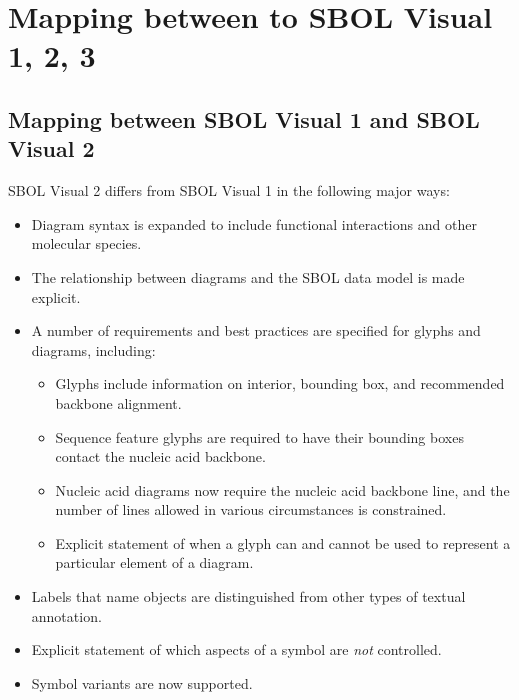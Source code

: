 \section{Mapping between to SBOL Visual 1, 2, 3}\label{sec:specmapping}

\subsection{Mapping between SBOL Visual 1 and SBOL Visual 2}\label{sec:sbol1}

SBOL Visual 2 differs from SBOL Visual 1 in the following major ways:
\begin{itemize}
\item Diagram syntax is expanded to include functional interactions and other molecular species.
\item The relationship between diagrams and the SBOL data model is made explicit.
\item A number of requirements and best practices are specified for glyphs and diagrams, including:
	\begin{itemize}
	\item Glyphs include information on interior, bounding box, and recommended backbone alignment.
	\item Sequence feature glyphs are required to have their bounding boxes contact the nucleic acid backbone.
	\item Nucleic acid diagrams now require the nucleic acid backbone line, and the number of lines allowed in various circumstances is constrained.
	\item Explicit statement of when a glyph can and cannot be used to represent a particular element of a diagram.
	\end{itemize}
\item Labels that name objects are distinguished from other types of textual annotation.
\item Explicit statement of which aspects of a symbol are {\em not} controlled.
\item Symbol variants are now supported.
\end{itemize}

